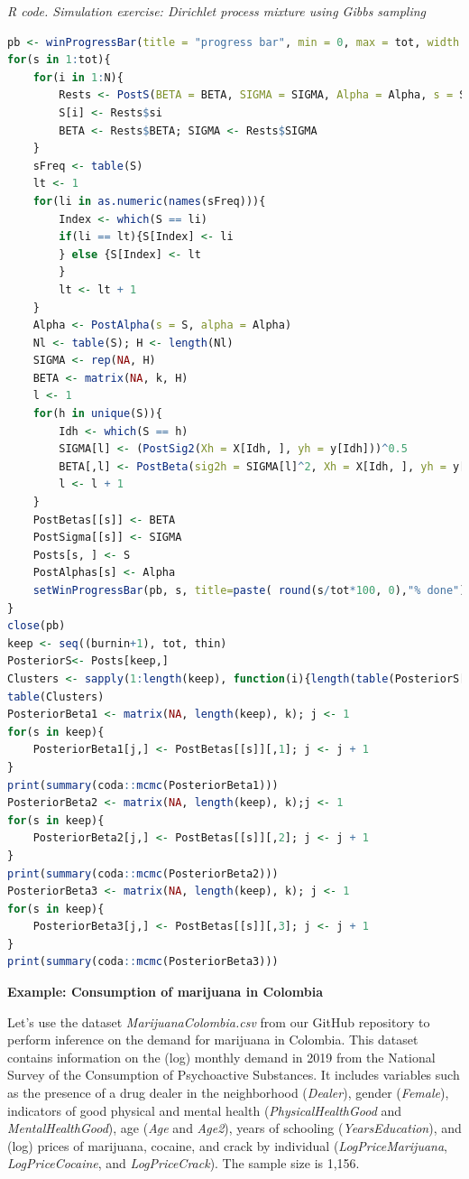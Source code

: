 \begin{tcolorbox}[enhanced,width=4.67in,center upper,
	fontupper=\large\bfseries,drop shadow southwest,sharp corners]
	\textit{R code. Simulation exercise: Dirichlet process mixture using Gibbs sampling}
	\begin{VF}
		\begin{lstlisting}[language=R]
pb <- winProgressBar(title = "progress bar", min = 0, max = tot, width = 300)
for(s in 1:tot){
	for(i in 1:N){
		Rests <- PostS(BETA = BETA, SIGMA = SIGMA, Alpha = Alpha, s = S, i = i)
		S[i] <- Rests$si
		BETA <- Rests$BETA; SIGMA <- Rests$SIGMA
	}
  	sFreq <- table(S)
	lt <- 1
	for(li in as.numeric(names(sFreq))){
		Index <- which(S == li)
		if(li == lt){S[Index] <- li
		} else {S[Index] <- lt
		}
		lt <- lt + 1
	}
	Alpha <- PostAlpha(s = S, alpha = Alpha)
	Nl <- table(S); H <- length(Nl)
	SIGMA <- rep(NA, H)
	BETA <- matrix(NA, k, H)
	l <- 1
	for(h in unique(S)){
		Idh <- which(S == h)
		SIGMA[l] <- (PostSig2(Xh = X[Idh, ], yh = y[Idh]))^0.5
		BETA[,l] <- PostBeta(sig2h = SIGMA[l]^2, Xh = X[Idh, ], yh = y[Idh])
		l <- l + 1
	}
	PostBetas[[s]] <- BETA
	PostSigma[[s]] <- SIGMA
	Posts[s, ] <- S
	PostAlphas[s] <- Alpha
	setWinProgressBar(pb, s, title=paste( round(s/tot*100, 0),"% done"))
}
close(pb)
keep <- seq((burnin+1), tot, thin)
PosteriorS<- Posts[keep,]
Clusters <- sapply(1:length(keep), function(i){length(table(PosteriorS[i,]))})
table(Clusters)
PosteriorBeta1 <- matrix(NA, length(keep), k); j <- 1
for(s in keep){
	PosteriorBeta1[j,] <- PostBetas[[s]][,1]; j <- j + 1
}
print(summary(coda::mcmc(PosteriorBeta1)))
PosteriorBeta2 <- matrix(NA, length(keep), k);j <- 1
for(s in keep){
	PosteriorBeta2[j,] <- PostBetas[[s]][,2]; j <- j + 1
}
print(summary(coda::mcmc(PosteriorBeta2)))
PosteriorBeta3 <- matrix(NA, length(keep), k); j <- 1
for(s in keep){
	PosteriorBeta3[j,] <- PostBetas[[s]][,3]; j <- j + 1
}
print(summary(coda::mcmc(PosteriorBeta3)))
\end{lstlisting}
	\end{VF}
\end{tcolorbox}

\textbf{Example: Consumption of marijuana in Colombia}

Let's use the dataset \textit{MarijuanaColombia.csv} from our GitHub repository to perform inference on the demand for marijuana in Colombia. This dataset contains information on the (log) monthly demand in 2019 from the National Survey of the Consumption of Psychoactive Substances. It includes variables such as the presence of a drug dealer in the neighborhood (\textit{Dealer}), gender (\textit{Female}), indicators of good physical and mental health (\textit{PhysicalHealthGood} and \textit{MentalHealthGood}), age (\textit{Age} and \textit{Age2}), years of schooling (\textit{YearsEducation}), and (log) prices of marijuana, cocaine, and crack by individual (\textit{LogPriceMarijuana}, \textit{LogPriceCocaine}, and \textit{LogPriceCrack}). The sample size is 1,156. 

